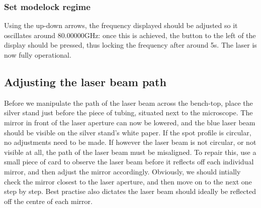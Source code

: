 \documentclass[14pt,a4paper] {article}
\begin{document}
\subsubsection{Set modelock regime}
 Using the up-down arrows, the frequency displayed should be adjusted so it oscillates around 80.00000GHz: once this is achieved, the button to the left of the display should be pressed, thus locking the frequency after around 5s. The laser is now fully operational.

\subsection{Adjusting the laser beam path}

Before we manipulate the path of the laser beam across the bench-top, place the silver stand just before the piece of tubing, situated next to the microscope. The mirror in front of the laser aperture can now be lowered, and the blue laser beam should be visible on the silver stand's white paper. If the spot profile is circular, no adjustments need to be made. If however the laser beam is not circular, or not visible at all, the path of the laser beam must be misaligned. To repair this, use a small piece of card to observe the laser beam before it reflects off each individual mirror, and then adjust the mirror accordingly. Obviously, we should intially check the mirror closest to the laser aperture, and then move on to the next one step by step. Best practise also dictates the laser beam should ideally be reflected off the centre of each mirror.










\end{document}
